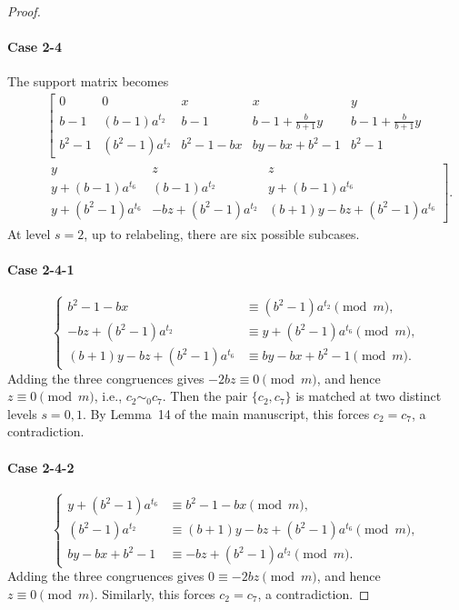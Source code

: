 \documentclass[11pt]{article}
\newcommand{\mymod}{\pmod{m}}
\begin{document}
\begin{proof}
\paragraph{Case 2-4}
The support matrix becomes
\begin{eqnarray*}
		~&~&\left[\begin{array}{ccccc}
        	0 & 0 & x & x & y\\
            b-1 & (b-1)a^{t_2} & b-1 & b-1+\frac{b}{b+1}y & b-1+\frac{b}{b+1}y \\
            b^2 -1 & (b^2-1)a^{t_2} & b^2-1-bx & by-bx+b^2-1 & b^2-1 
            \end{array}
            \right.\\
            ~&~& \left. \begin{array}{ccc}            
        	y & z & z\\        	
        	y+(b-1)a^{t_6} & (b-1)a^{t_2}   & y+(b-1)a^{t_6}\\ 
        	y+(b^2-1)a^{t_6} & -bz+(b^2-1)a^{t_2} & (b+1)y-bz+(b^2-1)a^{t_6}
        \end{array}
        \right]
        .
\end{eqnarray*}
At level $s=2$, up to relabeling, there are six possible subcases.

\paragraph{Case 2-4-1}
$$
\begin{cases}
	b^2-1-bx &\equiv (b^2-1)a^{t_2}\mymod, \\
	-bz+(b^2-1)a^{t_2} &\equiv y+(b^2-1)a^{t_6}\mymod, \\
	 (b+1)y-bz+(b^2-1)a^{t_6}&\equiv by-bx+b^2-1\mymod.
\end{cases}
$$
Adding the three congruences gives $-2bz\equiv0\mymod$, and hence
$z\equiv0\mymod$, i.e., $c_2\sim_0 c_7$. Then the pair $\{c_2,c_7\}$ is matched at two distinct levels $s=0,1$. By Lemma~14 of the main manuscript, this forces $c_2=c_7$, a
contradiction.

\paragraph{Case 2-4-2}
$$
\begin{cases}
	 y+(b^2-1)a^{t_6}&\equiv b^2-1-bx\mymod, \\
	(b^2-1)a^{t_2} &\equiv (b+1)y-bz+(b^2-1)a^{t_6} \mymod,\\
	by-bx+b^2-1 &\equiv -bz+(b^2-1)a^{t_2}\mymod.
\end{cases}
$$
Adding the three congruences gives $0\equiv-2bz\mymod$, and hence
$z\equiv0\mymod$. Similarly, this forces $c_2=c_7$, a
contradiction.


\end{proof}
\end{document}
